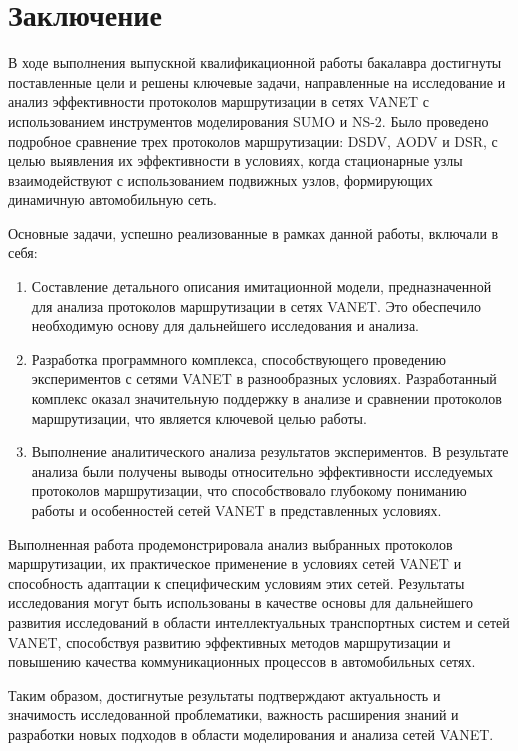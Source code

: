 \chapter*{Заключение}

В ходе выполнения выпускной квалификационной работы бакалавра достигнуты поставленные цели и решены ключевые задачи, направленные на исследование и анализ эффективности протоколов маршрутизации в сетях VANET с использованием инструментов моделирования SUMO и NS-2. Было проведено подробное сравнение трех протоколов маршрутизации: DSDV, AODV и DSR, с целью выявления их эффективности в условиях, когда стационарные узлы взаимодействуют с использованием подвижных узлов, формирующих динамичную автомобильную сеть.

Основные задачи, успешно реализованные в рамках данной работы, включали в себя:

\begin{enumerate}
    \item Составление детального описания имитационной модели, предназначенной для анализа протоколов маршрутизации в сетях VANET. Это обеспечило необходимую основу для дальнейшего исследования и анализа.
    \item Разработка программного комплекса, способствующего проведению экспериментов с сетями VANET в разнообразных условиях. Разработанный комплекс оказал значительную поддержку в анализе и сравнении протоколов маршрутизации, что является ключевой целью работы.
    \item Выполнение аналитического анализа результатов экспериментов. В результате анализа были получены выводы относительно эффективности исследуемых протоколов маршрутизации, что способствовало глубокому пониманию работы и особенностей сетей VANET в представленных условиях.
\end{enumerate}

Выполненная работа продемонстрировала анализ выбранных протоколов маршрутизации, их практическое применение в условиях сетей VANET и способность адаптации к специфическим условиям этих сетей. Результаты исследования могут быть использованы в качестве основы для дальнейшего развития исследований в области интеллектуальных транспортных систем и сетей VANET, способствуя развитию эффективных методов маршрутизации и повышению качества коммуникационных процессов в автомобильных сетях.

Таким образом, достигнутые результаты подтверждают актуальность и значимость исследованной проблематики, важность расширения знаний и разработки новых подходов в области моделирования и анализа сетей VANET.